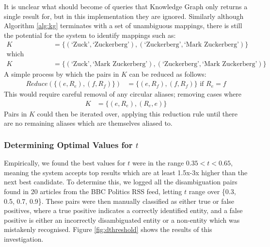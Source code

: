 It is unclear what should become of queries that Knowledge Graph only returns a single result for, but in this implementation they are ignored. Similarly although Algorithm \ref{alg:kg} terminates with a set of unambiguous mappings, there is still the potential for the system to identify mappings such as:
\begin{align*}
K &= \{(\text{`Zuck'}, \text{`Zuckerberg'}), (\text{`Zuckerberg'}, \text{`Mark Zuckerberg'})\} \\
\text{which simplifies to:}\\
K &= \{(\text{`Zuck'}, \text{`Mark Zuckerberg'}), (\text{`Zuckerberg'}, \text{`Mark Zuckerberg'})\}
\end{align*}
A simple process by which the pairs in $K$ can be reduced as follows:
\begin{align*}
Reduce(\{(e, R_e), (f, R_f)\}) &= \{(e, R_f), (f, R_f)\} \text{ if } R_e = f
\end{align*}
This would require careful removal of any circular aliases; removing cases where
\begin{align*}
K &= \{(e, R_e), (R_e, e)\}
\end{align*}
Pairs in $K$ could then be iterated over, applying this reduction rule until there are no remaining aliases which are themselves aliased to. 

\subsubsection{Determining Optimal Values for $t$}

Empirically, we found the best values for $t$ were in the range $0.35 < t < 0.65$, meaning the system accepts top results which are at least 1.5x-3x higher than the next best candidate. To determine this, we logged all the disambiguation pairs found in 20 articles from the BBC Politics RSS feed, letting $t$ range over \{0.3, 0.5, 0.7, 0.9\}. These pairs were then manually classified as either true or false positives, where a true positive indicates a correctly identified entity, and a false positive is either an incorrectly disambiguated entity or a non-entity which was mistakenly recognised. Figure \ref{fig:dthreshold} shows the results of this investigation.\\


